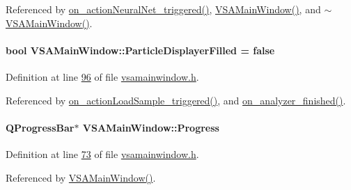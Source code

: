 Referenced by \hyperlink{vsamainwindow_8cpp_source_l00353}{on\+\_\+action\+Neural\+Net\+\_\+triggered()}, \hyperlink{vsamainwindow_8cpp_source_l00004}{V\+S\+A\+Main\+Window()}, and \hyperlink{vsamainwindow_8cpp_source_l00254}{$\sim$\+V\+S\+A\+Main\+Window()}.

\hypertarget{class_v_s_a_main_window_a503125fe2f31e5abd394790fc2768501}{}
\paragraph[{Particle\+Displayer\+Filled}]{\setlength{\rightskip}{0pt plus 5cm}bool V\+S\+A\+Main\+Window\+::\+Particle\+Displayer\+Filled = false\hspace{0.3cm}{\ttfamily [private]}}\label{class_v_s_a_main_window_a503125fe2f31e5abd394790fc2768501}


Definition at line \hyperlink{vsamainwindow_8h_source_l00096}{96} of file \hyperlink{vsamainwindow_8h_source}{vsamainwindow.\+h}.



Referenced by \hyperlink{vsamainwindow_8cpp_source_l00475}{on\+\_\+action\+Load\+Sample\+\_\+triggered()}, and \hyperlink{vsamainwindow_8cpp_source_l00275}{on\+\_\+analyzer\+\_\+finished()}.

\hypertarget{class_v_s_a_main_window_af5c6186795a53ecfe3efffc95b6619dd}{}
\paragraph[{Progress}]{\setlength{\rightskip}{0pt plus 5cm}Q\+Progress\+Bar$\ast$ V\+S\+A\+Main\+Window\+::\+Progress\hspace{0.3cm}{\ttfamily [private]}}\label{class_v_s_a_main_window_af5c6186795a53ecfe3efffc95b6619dd}


Definition at line \hyperlink{vsamainwindow_8h_source_l00073}{73} of file \hyperlink{vsamainwindow_8h_source}{vsamainwindow.\+h}.



Referenced by \hyperlink{vsamainwindow_8cpp_source_l00004}{V\+S\+A\+Main\+Window()}.

\hypertarget{class_v_s_a_main_window_a43651d26dd4d6d8971317d902294317c}{}
